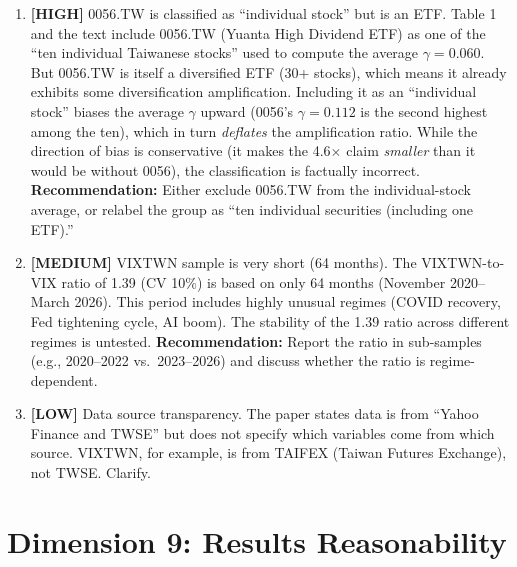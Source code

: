 \documentclass[12pt,a4paper]{article}
\newcommand{\HIGH}[1]{\textcolor{errorred}{\textbf{[HIGH]} #1}}
\newcommand{\MEDIUM}[1]{\textcolor{warncolor}{\textbf{[MEDIUM]} #1}}
\newcommand{\LOW}[1]{\textcolor{infocolor}{\textbf{[LOW]} #1}}
\begin{document}
\begin{enumerate}[leftmargin=2em]

\item \HIGH{0056.TW is classified as ``individual stock'' but is an ETF.} Table 1 and the text include 0056.TW (Yuanta High Dividend ETF) as one of the ``ten individual Taiwanese stocks'' used to compute the average $\gamma = 0.060$. But 0056.TW is itself a diversified ETF (30+ stocks), which means it already exhibits some diversification amplification. Including it as an ``individual stock'' biases the average $\gamma$ upward (0056's $\gamma = 0.112$ is the second highest among the ten), which in turn \textit{deflates} the amplification ratio. While the direction of bias is conservative (it makes the 4.6$\times$ claim \textit{smaller} than it would be without 0056), the classification is factually incorrect. \textbf{Recommendation:} Either exclude 0056.TW from the individual-stock average, or relabel the group as ``ten individual securities (including one ETF).''

\item \MEDIUM{VIXTWN sample is very short (64 months).} The VIXTWN-to-VIX ratio of 1.39 (CV 10\%) is based on only 64 months (November 2020--March 2026). This period includes highly unusual regimes (COVID recovery, Fed tightening cycle, AI boom). The stability of the 1.39 ratio across different regimes is untested. \textbf{Recommendation:} Report the ratio in sub-samples (e.g., 2020--2022 vs.\ 2023--2026) and discuss whether the ratio is regime-dependent.

\item \LOW{Data source transparency.} The paper states data is from ``Yahoo Finance and TWSE'' but does not specify which variables come from which source. VIXTWN, for example, is from TAIFEX (Taiwan Futures Exchange), not TWSE. Clarify.

\end{enumerate}

\section{Dimension 9: Results Reasonability}
\end{document}
